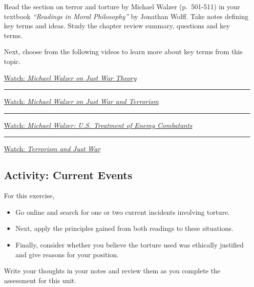 \documentclass[
]{book}
\providecommand{\tightlist}{%
  \setlength{\itemsep}{0pt}\setlength{\parskip}{0pt}}
\begin{document}
\begin{reflect}
Read the section on terror and torture by Michael Walzer (p.~501-511) in your textbook \emph{``Readings in Moral Philosophy''} by Jonathan Wolff. Take notes defining key terms and ideas. Study the chapter review summary, questions and key terms.

Next, choose from the following videos to learn more about key terms from this topic.

\href{https://www.youtube.com/watch?v=LcBovmGZSPU}{Watch: \emph{Michael Walzer on Just War Theory}}

\begin{center}\rule{0.5\linewidth}{0.5pt}\end{center}

\href{https://www.youtube.com/watch?v=TOfS3IIqP0M}{Watch: \emph{Michael Walzer on Just War and Terrorism}}

\begin{center}\rule{0.5\linewidth}{0.5pt}\end{center}

\href{https://www.youtube.com/watch?v=X_R6Lh-N2bg}{Watch: \emph{Michael Walzer: U.S. Treatment of Enemy Combatants}}

\begin{center}\rule{0.5\linewidth}{0.5pt}\end{center}

\href{https://www.youtube.com/watch?v=yZEprmCb5Pk}{Watch: \emph{Terrorism and Just War}}
\end{reflect}

\hypertarget{activity-current-events}{%
\subsection*{Activity: Current Events}\label{activity-current-events}}

\begin{reflect}
For this exercise,

\begin{itemize}
\tightlist
\item
  Go online and search for one or two current incidents involving torture.
\item
  Next, apply the principles gained from both readings to these situations.
\item
  Finally, consider whether you believe the torture used was ethically justified and give reasons for your position.
\end{itemize}

Write your thoughts in your notes and review them as you complete the assessment for this unit.
\end{reflect}
\end{document}
